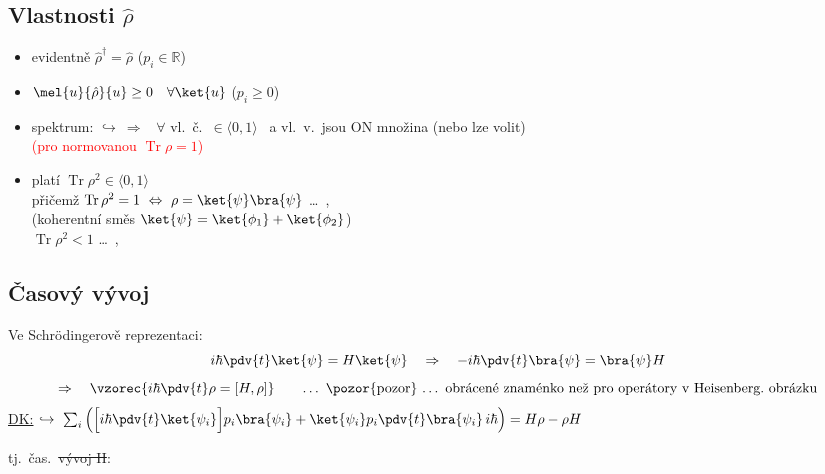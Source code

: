 \subsection*{Vlastnosti $\hat\rho$}
\begin{veta}
\begin{itemize}
  \item evidentně \quad $\hat\rho^\dagger = \hat\rho$ \quad ($p_i\in\mathbb{R}$) \hfill {}
  \item $\mel{u}{\hat\rho}{u} \geq 0 \quad \forall\ket{u}$ \quad ($p_i\geq 0$) \hfill {}
  \item spektrum: \quad $\hookrightarrow\ \Rightarrow$ \ $\forall$ vl.\ č.\ $\in\langle 0,1\rangle$ \ a vl.\ v.\ jsou ON množina (nebo lze volit) \\
         \quad \textcolor{Red}{(pro normovanou $\operatorname{Tr}\rho = 1$)}
  \item platí \quad $\operatorname{Tr}\rho^2\in\langle 0,1\rangle$ \\
        přičemž \quad $\operatorname{Tr}\rho^2 = 1 \ \Leftrightarrow\ \rho = \ket{\psi}\bra{\psi}$ \quad \dots\ ,  \\
        \hspace*{5.4cm} (koherentní směs $\ket{\psi} = \ket{\phi_1} + \ket{\phi_2}$) \\
        \phantom{přičemž} \quad $\operatorname{Tr}\rho^2 < 1$ \quad \dots\ , 
\end{itemize}
\end{veta}

\subsection*{Časový vývoj}
Ve Schrödingerově reprezentaci:
\[
  i\hbar\pdv{t}\ket{\psi} = H\ket{\psi} \quad\Rightarrow\quad -i\hbar\pdv{t}\bra{\psi} = \bra{\psi}H
\]
\[
  \Rightarrow\quad \vzorec{i\hbar\pdv{t}\rho = [H,\rho]}
  \qquad\text{\dots\ \pozor{pozor} \dots\ obrácené znaménko než pro operátory v Heisenberg.\ obrázku}
\]
\underline{DK:} \quad $\hookrightarrow\ \sum_i\Big(\Big[i\hbar\pdv{t}\ket{\psi_i}\Big]p_i\bra{\psi_i} + \ket{\psi_i}p_i\pdv{t}\bra{\psi_i}\,i\hbar\Big) = H\rho - \rho H$

tj.\ čas.\ \sout{vývoj H}: \quad {}

